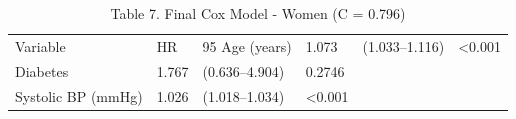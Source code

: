 \begin{table}[ht]
\centering
\caption{Table 7. Final Cox Model - Women (C = 0.796)} 
\begin{tabular}{llll}
  \toprule
Variable & HR & 95%
  \midrule
Age (years) & 1.073 & (1.033–1.116) & <0.001 \\ 
  Diabetes & 1.767 & (0.636–4.904) & 0.2746 \\ 
  Systolic BP (mmHg) & 1.026 & (1.018–1.034) & <0.001 \\ 
   \bottomrule
\end{tabular}
\end{table}
